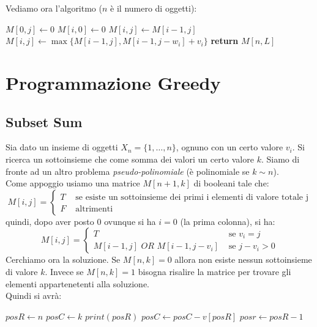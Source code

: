 \documentclass[a4paper,12pt, oneside]{book}
\begin{document}
Vediamo ora l'algoritmo ($n$ è il numero di oggetti):
\begin{algorithm}[H]
  \begin{algorithmic}
    \State $M[0,j]\gets 0$
    \EndFor
    \State $M[i,0]\gets 0$
    \EndFor
    \State $M[i,j]\gets M[i-1,j]$
    \Else
    \State $M[i,j]\gets \max\{M[i-1,j],M[i-1,j-w_i]+v_i\}$
    \EndIf
    \EndFor
    \EndFor
    \State \textbf{return} $M[n,L]$
    \EndFunction
  \end{algorithmic}
\end{algorithm}
\chapter{Programmazione Greedy}
\section{Subset Sum}
Sia dato un insieme di oggetti $X_n=\{1,\ldots, n\}$, ognuno con un
certo valore $v_i$. Si ricerca un sottoinsieme che come somma dei
valori un certo valore $k$. Siamo di fronte ad un altro problema
\textit{pseudo-polinomiale} (è polinomiale se $k\sim n$).\\
Come appoggio usiamo una matrice $M[n+1,k]$ di booleani tale che:
\[M[i,j]=
  \begin{cases}
    T & \mbox{ se esiste un sottoinsieme dei primi i elementi di
      valore totale j}\\
    F & \mbox{ altrimenti}
  \end{cases}
\]
quindi, dopo aver posto $0$ ovunque si ha $i=0$ (la prima colonna), si
ha:
\[M[i,j]=
  \begin{cases}
    T & \mbox{ se } v_i=j\\
    M[i-1,j]\,\,OR\,\, M[i-1,j-v_i] & \mbox{ se } j-v_i>0
  \end{cases}
\]
Cerchiamo ora la soluzione. Se $M[n,k]=0$ allora non esiste nessun
sottoinsieme di valore $k$. Invece se $M[n,k]=1$ bisogna risalire la
matrice per trovare gli elementi appartenetenti alla soluzione.\\
\newpage
Quindi si avrà:
\begin{algorithm}[H]
  \begin{algorithmic}
    \State $posR\gets n$
    \State $posC\gets k$
    \State $print(posR)$
    \State $posC\gets posC - v[posR]$
    \EndIf
    \State $posr \gets posR-1$
    \EndWhile
    \EndFunction
  \end{algorithmic}
\end{algorithm}
\end{document}
